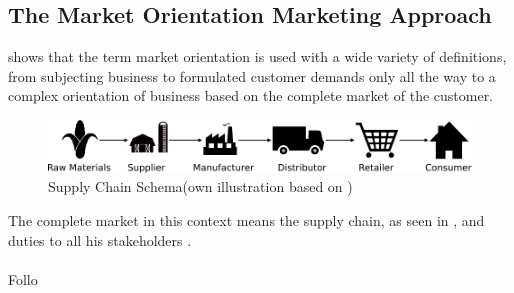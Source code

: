 \subsection{The Market Orientation Marketing Approach}
\textcite[9-10]{Claen.2016} shows that the term market orientation is used with a wide variety of definitions, from subjecting business to formulated customer demands only all the way to a complex orientation of business based on the complete market of the customer.
\begin{figure}[H]
	\includegraphics[width=\textwidth]{img/supplychain.pdf}
	\caption[Supply Chain Schema]{Supply Chain Schema(own illustration based on \protect\cite{SouthwestTech})}
    	\label{fig:supplychain}
\end{figure}
The complete market in this context means the supply chain, as seen in , and duties to all his stakeholders \parencite[cf.][22-23]{Claen.2016}.

\paragraph{} Follo